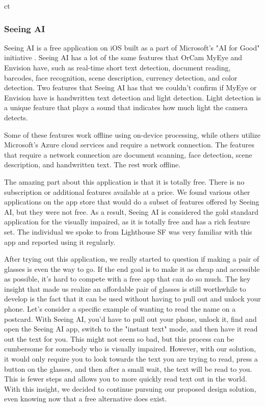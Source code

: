 ct\documentclass[a4paper,11pt]{article}
\begin{document}
\subsubsection{Seeing AI}
Seeing AI is a free application on iOS built as a part of Microsoft's "AI for Good" initiative \cite{seeing-ai}. Seeing AI has a lot of the same features that OrCam MyEye and Envision have, such as real-time short text detection, document reading, barcodes, face recognition, scene description, currency detection, and color detection. Two features that Seeing AI has that we couldn't confirm if MyEye or Envision have is handwritten text detection and light detection. Light detection is a unique feature that plays a sound that indicates how much light the camera detects. 

Some of these features work offline using on-device processing, while others utilize Microsoft's Azure cloud services and require a network connection. The features that require a network connection are document scanning, face detection, scene description, and handwritten text. The rest work offline.

The amazing part about this application is that it is totally free. There is no subscription or additional features available at a price. We found various other applications on the app store that would do a subset of features offered by Seeing AI, but they were not free. As a result, Seeing AI is considered the gold standard application for the visually impaired, as it is totally free and has a rich feature set. The individual we spoke to from Lighthouse SF was very familiar with this app and reported using it regularly.

After trying out this application, we really started to question if making a pair of glasses is even the way to go. If the end goal is to make it as cheap and accessible as possible, it's hard to compete with a free app that can do so much. The key insight that made us realize an affordable pair of glasses is still worthwhile to develop is the fact that it can be used without having to pull out and unlock your phone. Let's consider a specific example of wanting to read the name on a postcard. With Seeing AI, you'd have to pull out your phone, unlock it, find and open the Seeing AI app, switch to the "instant text" mode, and then have it read out the text for you. This might not seem so bad, but this process can be cumbersome for somebody who is visually impaired. However, with our solution, it would only require you to look towards the text you are trying to read, press a button on the glasses, and then after a small wait, the text will be read to you. This is fewer steps and allows you to more quickly read text out in the world. With this insight, we decided to continue pursuing our proposed design solution, even knowing now that a free alternative does exist.
\end{document}
